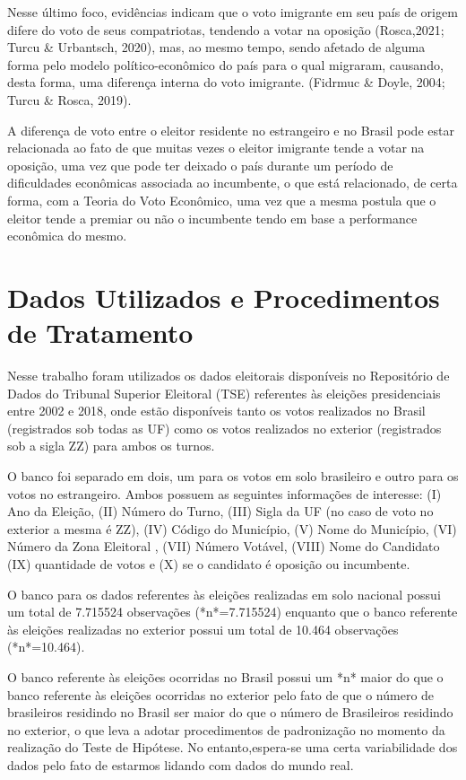 \documentclass{article}
\begin{document}
Nesse último foco, evidências indicam que o voto imigrante em seu país de origem difere do voto de seus compatriotas, tendendo a votar na oposição (Rosca,2021; Turcu \& Urbantsch, 2020), mas, ao mesmo tempo, sendo afetado de alguma forma pelo modelo político-econômico do país para o qual migraram, causando, desta forma, uma diferença interna do voto imigrante. (Fidrmuc \& Doyle, 2004; Turcu \& Rosca, 2019).


A diferença de voto entre o eleitor residente no estrangeiro e no Brasil pode estar relacionada ao fato de que muitas vezes o eleitor imigrante tende a votar na oposição, uma vez que pode ter deixado o país durante um período de dificuldades econômicas associada ao incumbente, o que está relacionado, de certa forma, com a Teoria do Voto Econômico, uma vez que a mesma postula que o eleitor tende a premiar ou não o incumbente tendo em base a performance econômica do mesmo.

\section{Dados Utilizados e Procedimentos de Tratamento}

Nesse trabalho foram utilizados os dados eleitorais disponíveis no Repositório de Dados do Tribunal Superior Eleitoral (TSE) referentes às eleições presidenciais entre 2002 e 2018, onde estão disponíveis tanto os votos realizados no Brasil (registrados sob todas as UF) como os votos realizados no exterior (registrados sob a sigla ZZ) para ambos os turnos.

O banco foi separado em dois, um para os votos em solo brasileiro e outro para os votos no estrangeiro. Ambos possuem as seguintes informações de interesse: (I) Ano da Eleição, (II) Número do Turno, (III) Sigla da UF (no caso de voto no exterior a mesma é ZZ), (IV) Código do Município, (V) Nome do Município, (VI) Número da Zona Eleitoral , (VII) Número Votável, (VIII) Nome do Candidato (IX) quantidade de votos e (X) se o candidato é oposição ou incumbente. 

O banco para os dados referentes às eleições realizadas em solo nacional possui um total de 7.715524 observações (*n*=7.715524) enquanto que o banco referente às eleições realizadas no exterior possui um total de 10.464 observações (*n*=10.464). 

O banco referente às eleições ocorridas no Brasil possui um *n* maior do que o banco referente às eleições ocorridas no exterior pelo fato de que o número de brasileiros residindo no Brasil ser maior do que o número de Brasileiros residindo no exterior, o que leva a adotar procedimentos de padronização no momento da realização do Teste de Hipótese. No entanto,espera-se uma certa variabilidade dos dados pelo fato de estarmos lidando com dados do mundo real.
\end{document}
